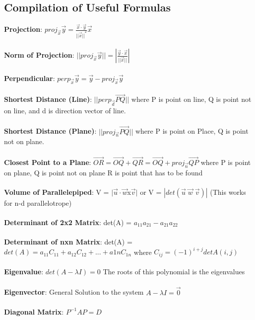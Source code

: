 \documentclass[12pt]{article}
\newcommand{\vectorproj}[2][]{\textit{proj}_{\vec{#1}}\vec{#2}}
\newcommand{\vectorperp}[2][]{\textit{perp}_{\vec{#1}}\vec{#2}}
\begin{document}
\newpage
\begin{appendices}
\appendix 
\section{Compilation of Useful Formulas}
\label{appendix:Formula}
\noindent
\textbf{Projection}: $\vectorproj[x]{y} = \frac{\vec{x}\cdot\vec{y}}{{||\vec{x}||}^2}\vec{x}$\\\\
\noindent
\textbf{Norm of Projection}: $||\vectorproj[x]{y}|| = |\frac{\vec{y}\cdot\vec{x}}{||\vec{x}||}|$\\\\
\noindent
\textbf{Perpendicular}: $\vectorperp[x]{y} = \vec{y} - \vectorproj[x]{y}$\\\\
\noindent
\textbf{Shortest Distance (Line)}: $||\vectorperp[d]{{PQ}}||$ where P is point on line, Q is point not on line, and d is direction vector of line.\\\\
\noindent
\textbf{Shortest Distance (Plane)}: $||\vectorproj[n]{{PQ}}||$ where P is point on Place, Q is point not on plane.\\\\
\noindent
\textbf{Closest Point to a Plane}: $\vec{OR} = \vec{OQ} + \vec{QR} = \vec{OQ} + \vectorproj[n]{QP}$ where P is point on plane, Q is point not on plane R is point that has to be found\\\\
\noindent
\textbf{Volume of Parallelepiped}: V = $|\vec{u}\cdot\vec{w}$x$\vec{v}|$
or V = $|det(\vec{u}\;\vec{w}\; \vec{v})|$ (This works for n-d parallelotrope)\\\\
\noindent
\textbf{Determinant of 2x2 Matrix}: det(A) = $a_{11}a_{21} - a_{21}a_{22}$\\\\
\noindent
\textbf{Determinant of nxn Matrix}: det(A) = $det(A) = a_{11}C_{11} + a_{12}C_{12}+...+a{1n}C_{1n}$ where $C_{ij} = (-1)^{i+j}detA(i,j)$\\\\
\noindent
\textbf{Eigenvalue}: $det(A-\lambda I) = 0$ The roots of this polynomial is the eigenvalues\\\\
\noindent
\textbf{Eigenvector}: General Solution to the system $A-\lambda I = \vec{0}$\\\\
\noindent
\textbf{Diagonal Matrix}: $P^{-1}AP = D$\\\\

\end{appendices}
\end{document}
